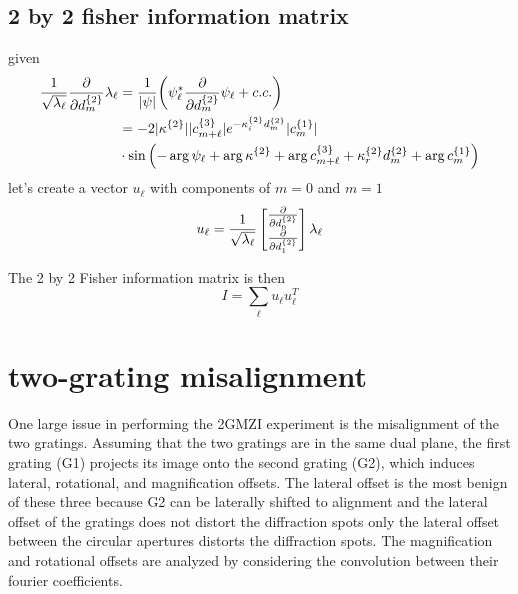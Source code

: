 \documentclass[12pt]{article}
\begin{document}
\subsection{2 by 2 fisher information matrix}
given 
\begin{align*}
    \frac{1}{\sqrt{\lambda_\ell}} \pdv{d^{\{2\}}_m} \lambda_\ell &=
    \frac{1}{|\psi|}\qty(\psi_\ell^* \pdv{d^{\{2\}}_m} \psi_\ell + c.c.) \\ 
        &=-2 |\kappa^{\{2\}}| 
            |c^{\{3\}}_{m + \ell}|
            e^{-\kappa_i^{\{2\}} d^{\{2\}}_m}  
            |c^{\{1\}}_m|\\
            &\cdot \sin\qty(
                - \arg{\psi_\ell} 
                + \arg{\kappa^{\{2\}}}
                + \arg{c^{\{3\}}_{m + \ell}}
                + \kappa_r^{\{2\}} d^{\{2\}}_m 
                + \arg{c^{\{1\}}_m}
                )
\end{align*}
let's create a vector $u_\ell$ with components of $m=0$ and $m=1$
\begin{equation*}
    u_\ell = \frac{1}{\sqrt{\lambda_\ell}} \begin{bmatrix}
        \pdv{d^{\{2\}}_0}  \\
        \pdv{d^{\{2\}}_1} 
    \end{bmatrix} \lambda_\ell
\end{equation*}

The 2 by 2 Fisher information matrix is then
\begin{equation*}
    I = \sum_\ell u_\ell u_\ell^T
\end{equation*}

\section{two-grating misalignment}
One large issue in performing the 2GMZI experiment is the misalignment of the two gratings. 
Assuming that the two gratings are in the same dual plane, the first grating (G1) projects 
its image onto the second grating (G2), which induces lateral, rotational, and magnification 
offsets. The lateral offset is the most benign of these three because G2 can be laterally shifted 
to alignment and the lateral offset of the gratings does not distort the diffraction spots\textemdash
only the lateral offset between the circular apertures distorts the diffraction spots. The 
magnification and rotational offsets are analyzed by considering the convolution between their 
fourier coefficients.  
\end{document}
